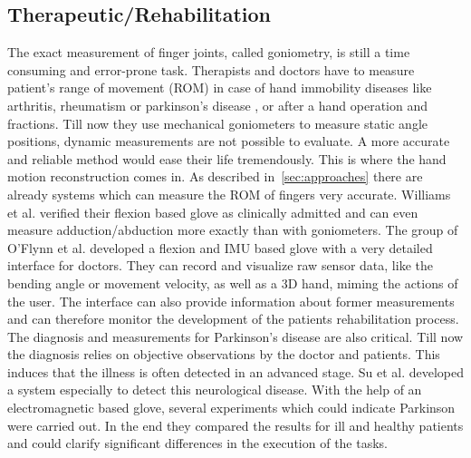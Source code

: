 \subsection{Therapeutic/Rehabilitation} \label{subsec:applications:reha}
The exact measurement of finger joints, called goniometry, is still a time consuming and error-prone task. Therapists and doctors have to measure patient's range of movement (ROM) in case of hand immobility diseases like arthritis, rheumatism \cite{o2013novel} or parkinson's disease \cite{su20033}, or after a hand operation and fractions. Till now they use mechanical goniometers \cite{williams2000goniometric} to measure static angle positions, dynamic measurements are not possible to evaluate. A more accurate and reliable method would ease their life tremendously. This is where the hand motion reconstruction comes in. As described in~\ref{sec:approaches} there are already systems which can measure the ROM of fingers very accurate. Williams et al. verified their flexion based glove as clinically admitted and can even measure adduction/abduction more exactly than with goniometers. The group of O'Flynn et al. developed a flexion and IMU based glove with a very detailed interface for doctors. They can record and visualize raw sensor data, like the bending angle or movement velocity, as well as a 3D hand, miming the actions of the user. The interface can also provide information about former measurements and can therefore monitor the development of the patients rehabilitation process. The diagnosis and measurements for Parkinson's disease are also critical. Till now the diagnosis relies on objective observations by the doctor and patients. This induces that the illness is often detected in an advanced stage. Su et al. developed a system especially to detect this neurological disease. With the help of an electromagnetic based glove, several experiments which could indicate Parkinson were carried out. In the end they compared the results for ill and healthy patients and could clarify significant differences in the execution of the tasks.\\
